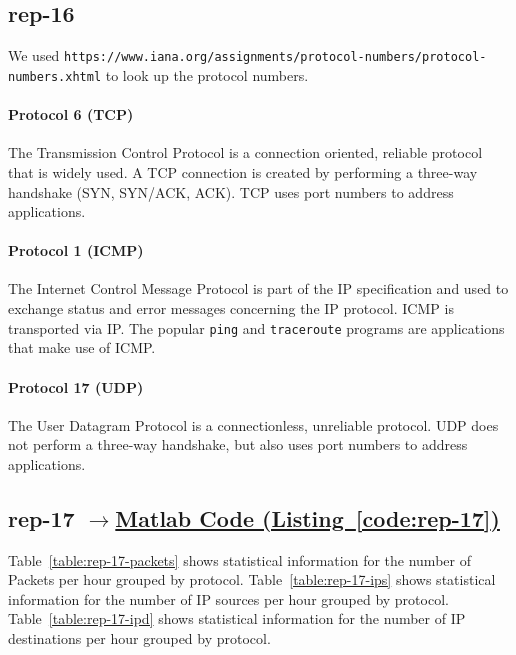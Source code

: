 \documentclass{article}
\newcommand{\codelink}[1]{%
    \hyperref[#1]{\quad$\rightarrow$\enskip Matlab Code (Listing~\ref{#1})}%
}
\begin{document}
\subsection{rep-16}

We used \texttt{https://www.iana.org/assignments/protocol-numbers/protocol-numbers.xhtml} to look up the
protocol numbers.

\paragraph{Protocol 6 (TCP)}
The Transmission Control Protocol is a connection oriented, reliable protocol that is widely used.
A TCP connection is created by performing a three-way handshake (SYN, SYN/ACK, ACK). TCP uses
port numbers to address applications.

\paragraph{Protocol 1 (ICMP)}
The Internet Control Message Protocol is part of the IP specification and used to exchange status and
error messages concerning the IP protocol. ICMP is transported via IP. The popular \texttt{ping} and
\texttt{traceroute} programs are applications that make use of ICMP.

\paragraph{Protocol 17 (UDP)}
The User Datagram Protocol is a connectionless, unreliable protocol. UDP does not perform
a three-way handshake, but also uses port numbers to address applications.

\subsection{rep-17 \codelink{code:rep-17}}

Table~\ref{table:rep-17-packets} shows statistical information for the number of Packets per hour grouped by protocol.
Table~\ref{table:rep-17-ips} shows statistical information for the number of IP sources per hour grouped by protocol.
Table~\ref{table:rep-17-ipd} shows statistical information for the number of IP destinations per hour grouped by protocol.
\end{document}
